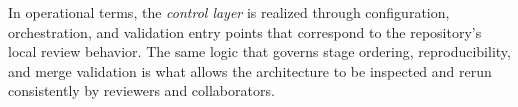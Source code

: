 \documentclass{IEEEtran}
\begin{document}
In operational terms, the \textit{control layer} is realized through configuration, orchestration, and validation entry points that correspond to the repository's local review behavior. The same logic that governs stage ordering, reproducibility, and merge validation is what allows the architecture to be inspected and rerun consistently by reviewers and collaborators.



\end{document}
